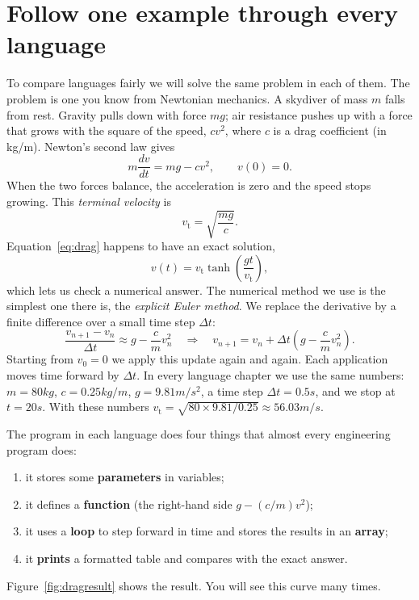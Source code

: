 \section*{Follow one example through every language}
\label{sec:runningexample}

To compare languages fairly we will solve the same problem in each of them. The problem
is one you know from Newtonian mechanics. A skydiver of mass $m$ falls from rest.
Gravity pulls down with force $mg$; air resistance pushes up with a force that grows
with the square of the speed, $c v^2$, where $c$ is a drag coefficient (in kg/m).
Newton's second law gives
\begin{equation}
  m\frac{dv}{dt} = mg - c v^2, \qquad v(0) = 0.
  \label{eq:drag}
\end{equation}
When the two forces balance, the acceleration is zero and the speed stops growing.
This \emph{terminal velocity} is
\begin{equation}
  v_\mathrm{t} = \sqrt{\frac{mg}{c}}.
  \label{eq:vterminal}
\end{equation}
Equation~\eqref{eq:drag} happens to have an exact solution,
\begin{equation}
  v(t) = v_\mathrm{t}\tanh\!\left(\frac{g t}{v_\mathrm{t}}\right),
  \label{eq:dragexact}
\end{equation}
which lets us check a numerical answer. The numerical method we use is the simplest one
there is, the \emph{explicit Euler method}. We replace the derivative by a finite
difference over a small time step $\Delta t$:
\begin{equation}
  \frac{v_{n+1} - v_n}{\Delta t} \approx g - \frac{c}{m} v_n^2
  \quad\Longrightarrow\quad
  v_{n+1} = v_n + \Delta t\left(g - \frac{c}{m}v_n^2\right).
  \label{eq:euler}
\end{equation}
Starting from $v_0 = 0$ we apply this update again and again. Each application moves
time forward by $\Delta t$. In every language chapter we use the same numbers:
$m = 80\unit{kg}$, $c = 0.25\unit{kg/m}$, $g = 9.81\unit{m/s^2}$, a time step
$\Delta t = 0.5\unit{s}$, and we stop at $t = 20\unit{s}$. With these numbers
$v_\mathrm{t} = \sqrt{80 \times 9.81/0.25} \approx 56.03\unit{m/s}$.

The program in each language does four things that almost every engineering program does:
\begin{enumerate}
\item it stores some \textbf{parameters} in variables;
\item it defines a \textbf{function} (the right-hand side $g - (c/m)v^2$);
\item it uses a \textbf{loop} to step forward in time and stores the results in an
  \textbf{array};
\item it \textbf{prints} a formatted table and compares with the exact answer.
\end{enumerate}
Figure~\ref{fig:dragresult} shows the result. You will see this curve many times.

